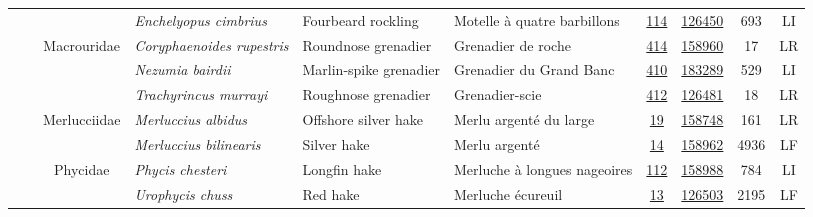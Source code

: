 \documentclass[12pt]{article}\usepackage[]{graphicx}\usepackage[]{color}
\begin{document}
\begin{landscapepage}
\begin{longtable}[t]{ccc>{\centering\arraybackslash}p{3cm}>{\centering\arraybackslash}p{3cm}>{\centering\arraybackslash}p{3cm}>{}c>{}ccc}
\hspace{1em}\hspace{1em} &  &  & \em{Enchelyopus cimbrius} & Fourbeard rockling & Motelle à quatre barbillons & \href{#sec:412}{114} & \href{http://www.marinespecies.org/aphia.php?p=taxdetails&id=126481}{126450} & 693 & LI\\
\hspace{1em}\hspace{1em} &  & Macrouridae & \em{Coryphaenoides rupestris} & Roundnose grenadier & Grenadier de roche & \href{#sec:414}{414} & \href{http://www.marinespecies.org/aphia.php?p=taxdetails&id=158960}{158960} & 17 & LR\\
\hspace{1em}\hspace{1em} &  &  & \em{Nezumia bairdii} & Marlin-spike grenadier & Grenadier du Grand Banc & \href{#sec:23}{410} & \href{http://www.marinespecies.org/aphia.php?p=taxdetails&id=126175}{183289} & 529 & LI\\
\hspace{1em}\hspace{1em} &  &  & \em{Trachyrincus murrayi} & Roughnose grenadier & Grenadier-scie & \href{#sec:123}{412} & \href{http://www.marinespecies.org/aphia.php?p=taxdetails&id=127251}{126481} & 18 & LR\\
\hspace{1em}\hspace{1em} &  & Merlucciidae & \em{Merluccius albidus} & Offshore silver hake & Merlu argenté du large & \href{#sec:300}{19} & \href{http://www.marinespecies.org/aphia.php?p=taxdetails&id=159520}{158748} & 161 & LR\\
\hspace{1em}\hspace{1em} &  &  & \em{Merluccius bilinearis} & Silver hake & Merlu argenté & \href{#sec:301}{14} & \href{http://www.marinespecies.org/aphia.php?p=taxdetails&id=127203}{158962} & 4936 & LF\\
\hspace{1em}\hspace{1em} &  & Phycidae & \em{Phycis chesteri} & Longfin hake & Merluche à longues nageoires & \href{#sec:303}{112} & \href{http://www.marinespecies.org/aphia.php?p=taxdetails&id=159519}{158988} & 784 & LI\\
\hspace{1em}\hspace{1em} &  &  & \em{Urophycis chuss} & Red hake & Merluche écureuil & \href{#sec:304}{13} & \href{http://www.marinespecies.org/aphia.php?p=taxdetails&id=127205}{126503} & 2195 & LF\\

\end{longtable}
\end{landscapepage}
\end{document}

